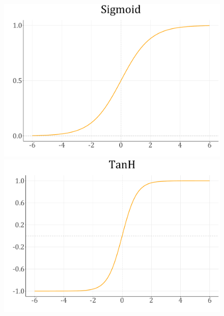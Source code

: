 \documentclass[spanish,a4paper,12pt,twoside]{report}
\begin{document}
    \begin{figure}[H]
      \begin{minipage}{0.49\textwidth}
        \centering
        \includegraphics[width = 1\linewidth]{resources/Fig12_3.pdf}
      \end{minipage}
      \begin{minipage}{0.49\textwidth}
        \centering
        \includegraphics[width = 1\linewidth]{resources/Fig12_4.pdf}
      \end{minipage}
    \end{figure}
\end{document}
